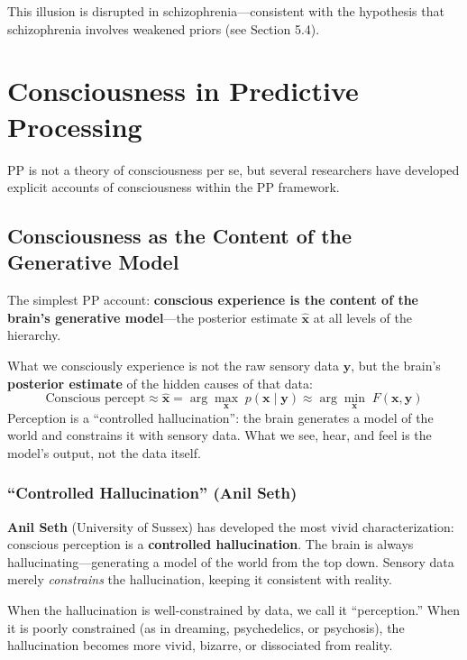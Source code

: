 \documentclass[11pt,a4paper]{report}
\begin{document}
This illusion is disrupted in schizophrenia---consistent with the hypothesis that schizophrenia involves weakened priors (see Section 5.4).


\chapter{Consciousness in Predictive Processing}

PP is not a theory of consciousness per se, but several researchers have developed explicit accounts of consciousness within the PP framework.

\section{Consciousness as the Content of the Generative Model}

The simplest PP account: \textbf{conscious experience is the content of the brain's generative model}---the posterior estimate $\hat{\mathbf{x}}$ at all levels of the hierarchy.

\begin{principlebox}
What we consciously experience is not the raw sensory data $\mathbf{y}$, but the brain's \textbf{posterior estimate} of the hidden causes of that data:
\[
  \text{Conscious percept} \approx \hat{\mathbf{x}} = \arg\max_{\mathbf{x}}\; p(\mathbf{x} \mid \mathbf{y}) \approx \arg\min_{\mathbf{x}}\; F(\mathbf{x}, \mathbf{y})
\]
Perception is a ``controlled hallucination'': the brain generates a model of the world and constrains it with sensory data. What we see, hear, and feel is the model's output, not the data itself.
\end{principlebox}

\subsection{``Controlled Hallucination'' (Anil Seth)}

\textbf{Anil Seth} (University of Sussex) has developed the most vivid characterization: conscious perception is a \textbf{controlled hallucination}. The brain is always hallucinating---generating a model of the world from the top down. Sensory data merely \emph{constrains} the hallucination, keeping it consistent with reality.

When the hallucination is well-constrained by data, we call it ``perception.'' When it is poorly constrained (as in dreaming, psychedelics, or psychosis), the hallucination becomes more vivid, bizarre, or dissociated from reality.
\end{document}
